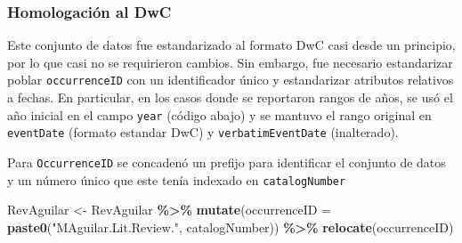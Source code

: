 \documentclass[sn-apa,pdflatex]{sn-jnl}
\newenvironment{Shaded}{\begin{snugshade}}{\end{snugshade}}
\newcommand{\AttributeTok}[1]{\textcolor[rgb]{0.13,0.29,0.53}{#1}}
\newcommand{\CommentTok}[1]{\textcolor[rgb]{0.56,0.35,0.01}{\textit{#1}}}
\newcommand{\DecValTok}[1]{\textcolor[rgb]{0.00,0.00,0.81}{#1}}
\newcommand{\FunctionTok}[1]{\textcolor[rgb]{0.13,0.29,0.53}{\textbf{#1}}}
\newcommand{\NormalTok}[1]{#1}
\newcommand{\OtherTok}[1]{\textcolor[rgb]{0.56,0.35,0.01}{#1}}
\newcommand{\SpecialCharTok}[1]{\textcolor[rgb]{0.81,0.36,0.00}{\textbf{#1}}}
\newcommand{\StringTok}[1]{\textcolor[rgb]{0.31,0.60,0.02}{#1}}
\begin{document}
\begin{Shaded}
\end{Shaded}

\subsubsection{Homologación al DwC}\label{homologaciuxf3n-al-dwc-1}

Este conjunto de datos fue estandarizado al formato DwC casi desde un
principio, por lo que casi no se requirieron cambios. Sin embargo, fue
necesario estandarizar poblar \texttt{occurrenceID} con un identificador
único y estandarizar atributos relativos a fechas. En particular, en los
casos donde se reportaron rangos de años, se usó el año inicial en el
campo \texttt{year} (código abajo) y se mantuvo el rango original en
\texttt{eventDate} (formato estandar DwC) y \texttt{verbatimEventDate}
(inalterado).

Para \texttt{OccurrenceID} se concadenó un prefijo para identificar el
conjunto de datos y un número único que este tenía indexado en
\texttt{catalogNumber}

\begin{Shaded}
\begin{Highlighting}[]
\NormalTok{RevAguilar }\OtherTok{\textless{}{-}}\NormalTok{ RevAguilar }\SpecialCharTok{\%\textgreater{}\%}
    \FunctionTok{mutate}\NormalTok{(}\AttributeTok{occurrenceID =} \FunctionTok{paste0}\NormalTok{(}\StringTok{"MAguilar.Lit.Review."}\NormalTok{, catalogNumber)) }\SpecialCharTok{\%\textgreater{}\%}
    \FunctionTok{relocate}\NormalTok{(occurrenceID)}
\end{Highlighting}
\end{Shaded}
\end{document}
